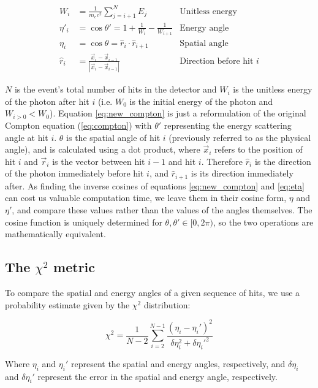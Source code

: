 \begin{align}
    W_i &= \frac{1}{m_ec^2}\sum_{j=i+1}^N E_j & \text{Unitless energy}\\
    \label{eq:new_compton}\eta'_i &= \cos\theta' = 1+\frac{1}{W_i}-\frac{1}{W_{i+1}} &\text{Energy angle}\\
    \eta_i &= \cos\theta = \hat{r}_i \cdot \hat{r}_{i+1} &\text{Spatial angle} \label{eq:eta}\\
    \hat{r}_i &= \frac{\vec{x}_i - \vec{x}_{i-1}}{|\vec{x}_i - \vec{x}_{i-1}|} & \text{Direction before hit $i$}
\end{align}

$N$ is the event's total number of hits in the detector and $W_i$ is the unitless energy of the photon after hit $i$ (i.e. $W_0$ is the initial energy of the photon and $W_{i>0} < W_0$). Equation \ref{eq:new_compton} is just a reformulation of the original Compton equation (\ref{eq:compton}) with $\theta'$ representing the energy scattering angle at hit $i$. $\theta$ is the spatial angle of hit $i$ (previously referred to as the physical angle), and is calculated using a dot product, where $\vec{x}_i$ refers to the position of hit $i$ and $\vec{r}_i$ is the vector between hit $i-1$ and hit $i$. Therefore $\hat{r}_i$ is the direction of the photon immediately before hit $i$, and $\hat{r}_{i+1}$ is its direction immediately after. As finding the inverse cosines of equations \ref{eq:new_compton} and \ref{eq:eta} can cost us valuable computation time, we leave them in their cosine form, $\eta$ and $\eta'$, and compare these values rather than the values of the angles themselves. The cosine function is uniquely determined for $\theta, \theta' \in [0, 2\pi)$, so the two operations are mathematically equivalent.

\subsection*{The $\chi^2$ metric}
To compare the spatial and energy angles of a given sequence of hits, we use a probability estimate given by the $\chi^2$ distribution:

\begin{equation}
    \label{eq:chi2}\chi^2 = \frac{1}{N-2} \sum_{i=2}^{N-1} \frac{(\eta_i-\eta_i')^2}{\delta\eta_i^2+\delta\eta_i'^2}
\end{equation}

Where $\eta_i$ and $\eta_i'$ represent the spatial and energy angles, respectively, and $\delta\eta_i$ and $\delta\eta_i'$ represent the error in the spatial and energy angle, respectively.

